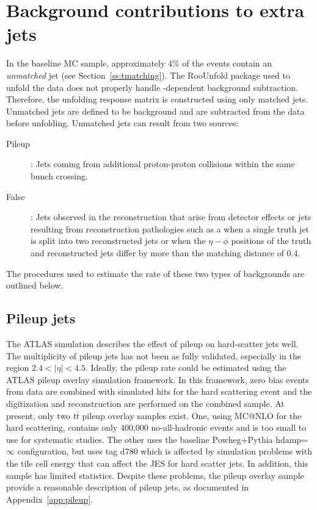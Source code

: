 \section{Background contributions to extra jets}
\label{ss:pileup}
In the baseline MC sample, approximately 4\% of the events contain an \textit{unmatched} jet (see Section~\ref{ss:tmatching}). The RooUnfold package used to unfold the data does not properly handle \pT-dependent background subtraction. Therefore, the unfolding response matrix is constructed using only matched jets. Unmatched jets are defined to be background and are subtracted from the data before unfolding. 
Unmatched jets can result from two sources: 
\begin{description}
\item[Pileup]: Jets coming from additional proton-proton collisions within the same bunch crossing.
\item[False]: Jets observed in the reconstruction that arise from detector effects or jets resulting from reconstruction pathologies such as a when a single truth jet is split into two reconstructed jets or when the $\eta-\phi$ positions of the truth and reconstructed jets differ by more than the matching distance of 0.4.
\end{description}
The  procedures used to estimate the rate of these two types of backgrounds are outlined below.

\subsection{Pileup jets}


The ATLAS simulation describes the effect of pileup on hard-scatter jets well.~\cite{jetpile} The multiplicity of pileup jets has not been as fully validated, especially in the region $2.4 < |\eta| < 4.5$.  Ideally, the pileup rate could be
estimated using the ATLAS pileup overlay simulation framework.  In this framework,
zero bias events from data are combined with simulated hits for the hard scattering event
and the digitization and reconstruction are performed on the combined sample.  At present,
only two $t\overline t$ pileup overlay samples exist.  One, using {\textsc MC@NLO} for the hard scattering,
contains only 400,000 no-all-hadronic events and is too small to use for
systematic studies.  The other uses the baseline {\textsc Powheg+Pythia} hdamp=$\infty$
configuration, but uses tag d780 which  is affected by simulation problems with the tile cell 
energy that can affect the JES for hard scatter jets.  In addition, this sample has
limited statistics.   Despite these problems, the pileup overlay sample
provide a reasonable description of pileup jets, as documented in Appendix~\ref{app:pileup}.

